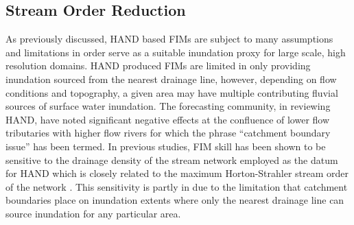 \documentclass[draft]{dependencies/agujournal2019}
\begin{document}
\subsection{Stream Order Reduction}
\label{ssec:stream_order_reduction}
%
As previously discussed, HAND based FIMs are subject to many assumptions and limitations in order serve as a suitable inundation proxy for large scale, high resolution domains.
HAND produced FIMs are limited in only providing inundation sourced from the nearest drainage line, however, depending on flow conditions and topography, a given area may have multiple contributing fluvial sources of surface water inundation.
The forecasting community, in reviewing HAND, have noted significant negative effects at the confluence of lower flow tributaries with higher flow rivers for which the phrase ``catchment boundary issue'' has been termed.
In previous studies, FIM skill has been shown to be sensitive to the drainage density of the stream network employed as the datum for HAND which is closely related to the maximum Horton-Strahler stream order of the network \cite{zhang2018comparative,mcgehee2016modified,li2020evaluation,nobre2016hand}.
This sensitivity is partly in due to the limitation that catchment boundaries place on inundation extents where only the nearest drainage line can source inundation for any particular area.
\end{document}
